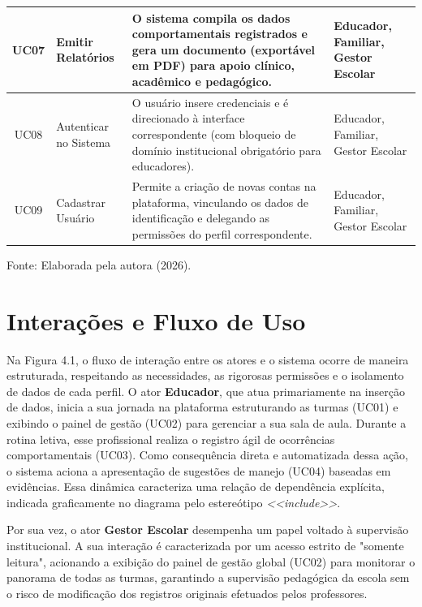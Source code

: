 \begin{quadro}[H]
\begin{tabular}{|c|p{3.2cm}|p{7cm}|p{2.8cm}|}
        UC07 & Emitir Relatórios & O sistema compila os dados comportamentais registrados e gera um documento (exportável em PDF) para apoio clínico, acadêmico e pedagógico. & Educador, Familiar, Gestor Escolar \\ \hline

        UC08 & Autenticar no Sistema & O usuário insere credenciais e é direcionado à interface correspondente (com bloqueio de domínio institucional obrigatório para educadores). & Educador, Familiar, Gestor Escolar \\ \hline

        UC09 & Cadastrar Usuário & Permite a criação de novas contas na plataforma, vinculando os dados de identificação e delegando as permissões do perfil correspondente. & Educador, Familiar, Gestor Escolar \\ \hline
    \end{tabular}
    
    \vspace{0.1cm}
    \begin{flushleft}
        \footnotesize Fonte: Elaborada pela autora (2026).
    \end{flushleft}
\end{quadro}

\vspace{0.5cm}
\section{Interações e Fluxo de Uso}

Na Figura 4.1, o fluxo de interação entre os atores e o sistema ocorre de maneira estruturada, respeitando as necessidades, as rigorosas permissões e o isolamento de dados de cada perfil. O ator \textbf{Educador}, que atua primariamente na inserção de dados, inicia a sua jornada na plataforma estruturando as turmas (UC01) e exibindo o painel de gestão (UC02) para gerenciar a sua sala de aula. Durante a rotina letiva, esse profissional realiza o registro ágil de ocorrências comportamentais (UC03). Como consequência direta e automatizada dessa ação, o sistema aciona a apresentação de sugestões de manejo (UC04) baseadas em evidências. Essa dinâmica caracteriza uma relação de dependência explícita, indicada graficamente no diagrama pelo estereótipo \textit{<<include>>}.

Por sua vez, o ator \textbf{Gestor Escolar} desempenha um papel voltado à supervisão institucional. A sua interação é caracterizada por um acesso estrito de "somente leitura", acionando a exibição do painel de gestão global (UC02) para monitorar o panorama de todas as turmas, garantindo a supervisão pedagógica da escola sem o risco de modificação dos registros originais efetuados pelos professores.

